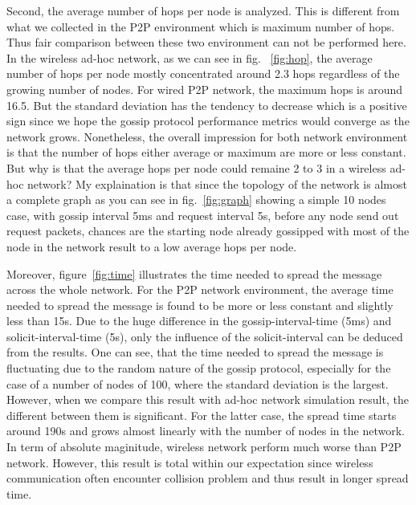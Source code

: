 Second, the average number of hops per node is analyzed. This is different from what we collected in the P2P environment which is maximum number of hops. Thus fair comparison between these two environment can not be performed here. In the wireless ad-hoc network, as we can see in fig. ~\ref{fig:hop}, the average number of hops per node mostly concentrated around 2.3 hops regardless of the growing number of nodes. For wired P2P network, the maximum hops is around 16.5. But the standard deviation has the tendency to decrease which is a positive sign since we hope the gossip protocol performance metrics would converge as the network grows. Nonetheless, the overall impression for both network environment is that the number of hops either average or maximum are more or less constant. But why is that the average hops per node could remaine 2 to 3 in a wireless ad-hoc network? My explaination is that since the topology of the network is almost a complete graph as you can see in fig.~\ref{fig:graph} showing a simple 10 nodes case, with gossip interval 5ms and request interval 5s, before any node send out request packets, chances are the starting node already gossipped with most of the node in the network result to a low average hops per node.

%


Moreover, figure~\ref{fig:time} illustrates the time needed to spread the message across the whole network. For the P2P network environment, the average time needed to spread the message is found to be more or less constant and slightly less than 15s. Due to the huge difference in the gossip-interval-time (5ms) and solicit-interval-time (5s), only the influence of the solicit-interval can be deduced from the results. One can see, that the time needed to spread the message is fluctuating due to the random nature of the gossip protocol, especially for the case of a number of nodes of 100, where the standard deviation is the largest. However, when we compare this result with ad-hoc network simulation result, the different between them is significant. For the latter case, the spread time starts around 190s and grows almost linearly with the number of nodes in the network. In term of absolute maginitude, wireless network perform much worse than P2P network. However, this result is total within our expectation since wireless communication often encounter collision problem and thus result in longer spread time.